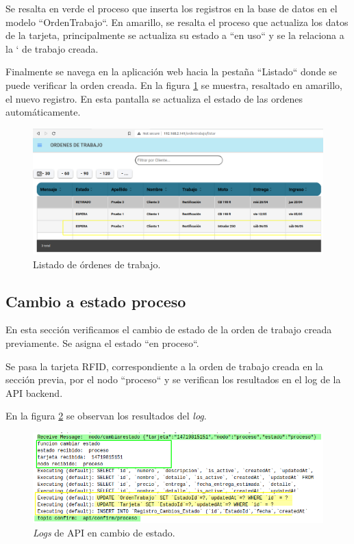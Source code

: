 Se resalta en verde el proceso que inserta los registros en la base de datos en el modelo ``OrdenTrabajo``. En amarillo, se resalta el proceso que actualiza los datos de la tarjeta, principalmente se actualiza su estado a ``en uso`` y se la relaciona a la ` de trabajo creada.

Finalmente se navega en la aplicación web hacia la pestaña ``Listado`` donde se puede verificar la orden creada. En la figura \ref{fig:ensayolistado} se muestra, resaltado en amarillo, el nuevo registro. En esta pantalla se actualiza el estado de las ordenes automáticamente.

\begin{figure}[H]
	\centering
	\includegraphics[width=\textwidth]{./Figures/ensayo-1/11.listado.png}
	\caption{Listado de órdenes de trabajo.}
	\label{fig:ensayolistado}
\end{figure}

\subsection{Cambio a estado proceso}
\label{subsec:ensayoaproceso}

En esta sección verificamos el cambio de estado de la orden de trabajo creada previamente. Se asigna el estado ``en proceso``.

Se pasa la tarjeta RFID, correspondiente a la orden de trabajo creada en la sección previa, por el nodo ``proceso`` y se verifican los resultados en el log de la API backend.

En la figura \ref{fig:cambioestado-api-log} se observan los resultados del \textit{log}.

\begin{figure}[H]
	\centering
	\includegraphics[width=\textwidth]{./Figures/ensayo-1/12.cambioestado-api-log.png}
	\caption{\textit{Logs} de API en cambio de estado.}
	\label{fig:cambioestado-api-log}
\end{figure}

